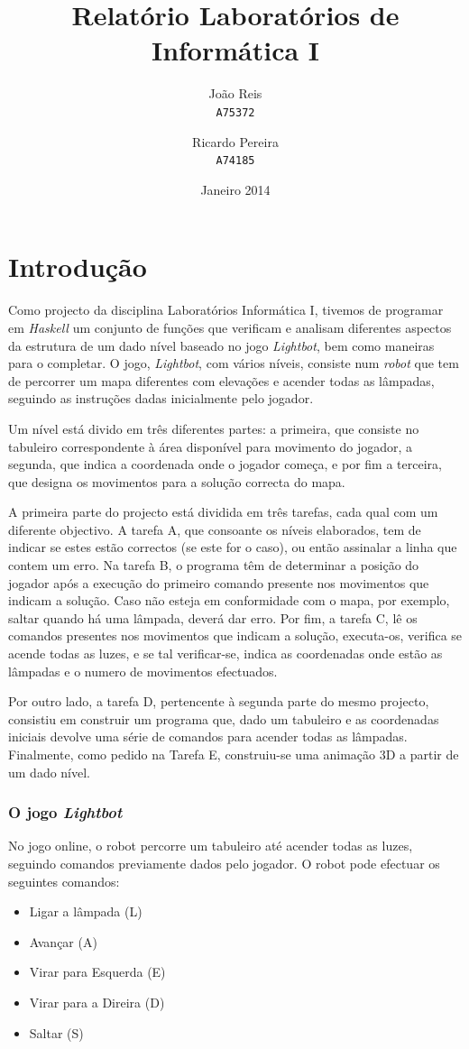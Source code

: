 \documentclass[a4paper]{article}
\author{João Reis\\
\texttt{A75372}
\and
Ricardo Pereira\\
\texttt{A74185}}
\date {Janeiro 2014}
\title{Relatório Laboratórios de Informática I}
\begin{document}
\maketitle
\section{Introdução}

Como projecto da disciplina Laboratórios Informática I, tivemos de programar em \textit{Haskell} um conjunto de funções que verificam e analisam diferentes aspectos da estrutura de um dado nível baseado no jogo \textit{Lightbot}, bem como maneiras para o completar.
O jogo, \textit{Lightbot}, com vários níveis, consiste num \textit{robot} que tem de percorrer um mapa diferentes com elevações e acender todas as lâmpadas, seguindo as instruções dadas inicialmente pelo jogador.

Um nível está divido em três diferentes partes: a primeira, que consiste no tabuleiro correspondente à área disponível para movimento do jogador, a segunda, que indica a coordenada onde o jogador começa, e por fim a terceira, que designa os movimentos para a solução correcta do mapa.

A primeira parte do projecto está dividida em três tarefas, cada qual com um diferente objectivo. A tarefa A, que consoante os níveis elaborados, tem de indicar se estes estão correctos (se este for o caso), ou então assinalar a linha que contem um erro. Na tarefa B, o programa têm de determinar a posição do jogador após a execução do primeiro comando presente nos movimentos que indicam a solução. Caso não esteja em conformidade com o mapa, por exemplo, saltar quando há uma lâmpada, deverá dar erro. Por fim, a tarefa C, lê os comandos presentes nos movimentos que indicam a solução, executa-os, verifica se acende todas as luzes, e se tal verificar-se, indica as coordenadas onde estão as lâmpadas e o numero de movimentos efectuados.

Por outro lado, a tarefa D, pertencente à segunda parte do mesmo projecto, consistiu em construir um programa que, dado um tabuleiro e as coordenadas iniciais devolve uma série de comandos para acender todas as lâmpadas. Finalmente, como pedido na Tarefa E, construiu-se uma animação 3D a partir de um dado nível.

\subsubsection{O jogo \textit{Lightbot}}
No jogo online, o robot percorre um tabuleiro até acender todas as luzes, seguindo comandos previamente dados pelo jogador.
O robot pode efectuar os seguintes comandos: 
\begin{itemize}
\item Ligar a lâmpada (L)
\item Avançar (A)
\item Virar para Esquerda (E)
\item Virar para a Direira (D)
\item Saltar (S)
\end{itemize}
\end{document}
